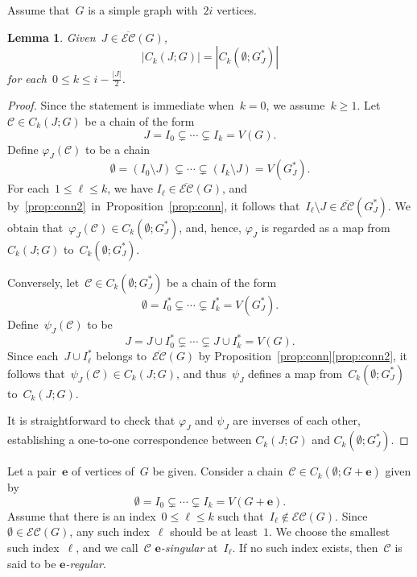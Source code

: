 \documentclass[10pt]{amsart}
\theoremstyle{plain}
\newtheorem{lemma}[theorem]{Lemma}
\numberwithin{equation}{section}
\theoremstyle{definition}
\newcommand{\cC}{\mathcal{C}}
\newcommand{\edge}{\mathbf{e}}
\newcommand{\EC}{\mathcal{E}\mathcal{C}}
\newcommand{\comp}{\overline{\EC}}
\begin{document}
Assume that~$G$ is a simple graph with~$2i$ vertices.
\begin{lemma}\label{lemma:collap}
    Given~$J \in \comp(G)$,
    $$
    \left\vert C_k(J;G) \right\vert = \left\vert C_k(\emptyset;G^\ast_J) \right\vert
    $$
    for each~$0 \leq k \leq i - \frac{\left\vert J \right\vert}{2}$.
\end{lemma}

\begin{proof}
    Since the statement is immediate when~$k = 0$, we assume~$k \geq 1$.
    Let $\cC \in C_k(J;G)$ be a chain of the form
    $$
    J= I_{0} \subsetneq \cdots \subsetneq I_{k} = V(G).
    $$
    Define $\varphi_J(\cC)$ to be a chain
    $$
    \emptyset = (I_0 \setminus J) \subsetneq \cdots \subsetneq (I_k \setminus J) = V(G^\ast_J).
    $$
    For each~$1 \leq \ell \leq k$, we have $I_\ell \in \comp(G)$, and by~\eqref{prop:conn2}~in~Proposition~\ref{prop:conn}, it follows that~$I_\ell \setminus J \in \comp(G^\ast_J)$.
    We obtain that~$\varphi_J(\cC) \in C_k(\emptyset; G^\ast_J)$, and, hence, $\varphi_J$ is regarded as a map from~$C_k(J;G)$ to~$C_k(\emptyset;G^\ast_J)$.
    
    Conversely, let~$\cC \in C_k(\emptyset;G^\ast_J)$ be a chain of the form
    $$
    \emptyset= I^\ast_{0} \subsetneq \cdots \subsetneq I^\ast_{k} = V(G^\ast_J).
    $$
    Define~$\psi_J(\cC)$ to be
    $$
    J = J \cup I^\ast_{0} \subsetneq \cdots \subsetneq J \cup I^\ast_{k} = V(G).
    $$
    Since each~$J \cup I^\ast_\ell$ belongs to~$\comp(G)$ by Proposition~\ref{prop:conn}\eqref{prop:conn2}, it follows that~$\psi_J(\cC) \in C_k(J;G)$, and thus~$\psi_J$ defines a map from~$C_k(\emptyset; G^\ast_J)$ to~$C_k(J;G)$.
    
    It is straightforward to check that $\varphi_J$ and $\psi_J$ are inverses of each other, establishing a one-to-one correspondence between $C_k(J;G)$ and $C_k(\emptyset; G^\ast_J)$.
\end{proof}


Let a pair~$\edge$ of vertices of~$G$ be given.
Consider a chain~$\cC \in C_k(\emptyset;G+\edge)$ given by
$$
\emptyset = I_0 \subsetneq \cdots \subsetneq I_k = V(G+\edge).
$$
Assume that there is an index~$0 \leq \ell \leq k$ such that~$I_\ell \notin \EC(G)$.
Since~$\emptyset \in \EC(G)$, any such index~$\ell$ should be at least~$1$.
We choose the smallest such index~$\ell$, and we call~$\cC$ \emph{$\edge$-singular} at~$I_\ell$.
If no such index exists, then~$\cC$ is said to be \emph{$\edge$-regular}.
\end{document}
